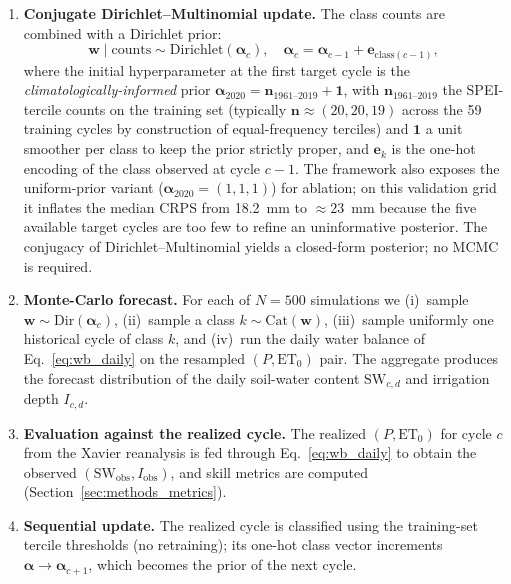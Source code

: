 \documentclass[review,5p,times]{elsarticle}
\begin{document}
\begin{enumerate}
\item \textbf{Conjugate Dirichlet--Multinomial update.} The class
counts are combined with a Dirichlet prior:
%
\begin{equation}
\boldsymbol{w} \mid \mathrm{counts} \sim \mathrm{Dirichlet}(\boldsymbol{\alpha}_c), \quad
\boldsymbol{\alpha}_c = \boldsymbol{\alpha}_{c-1} + \boldsymbol{e}_{\mathrm{class}(c-1)},
\label{eq:dirichlet}
\end{equation}
%
where the initial hyperparameter at the first target cycle is the
\emph{climatologically-informed} prior
$\boldsymbol{\alpha}_{2020} = \boldsymbol{n}_{1961\text{--}2019} +
\boldsymbol{1}$, with $\boldsymbol{n}_{1961\text{--}2019}$ the
SPEI-tercile counts on the training set (typically
$\boldsymbol{n}\approx(20,20,19)$ across the 59 training cycles by
construction of equal-frequency terciles) and $\boldsymbol{1}$ a
unit smoother per class to keep the prior strictly proper, and
$\boldsymbol{e}_k$ is the one-hot encoding of the class observed
at cycle $c-1$. The framework also exposes the uniform-prior
variant ($\boldsymbol{\alpha}_{2020}=(1,1,1)$) for ablation; on this
validation grid it inflates the median CRPS from 18.2~mm to
$\approx 23$~mm because the five available target cycles are too few
to refine an uninformative posterior. The conjugacy of
Dirichlet--Multinomial yields a closed-form posterior; no MCMC is
required.

\item \textbf{Monte-Carlo forecast.} For each of $N = 500$ simulations
we (i)~sample $\boldsymbol{w} \sim \mathrm{Dir}(\boldsymbol{\alpha}_c)$,
(ii)~sample a class $k \sim \mathrm{Cat}(\boldsymbol{w})$,
(iii)~sample uniformly one historical cycle of class $k$, and
(iv)~run the daily water balance of Eq.~\ref{eq:wb_daily} on the
resampled $(P, \mathrm{ET}_0)$ pair. The aggregate produces the
forecast distribution of the daily soil-water content
$\mathrm{SW}_{c,d}$ and irrigation depth $I_{c,d}$.

\item \textbf{Evaluation against the realized cycle.} The realized
$(P, \mathrm{ET}_0)$ for cycle $c$ from the Xavier reanalysis is fed
through Eq.~\ref{eq:wb_daily} to obtain the observed
$(\mathrm{SW}_{\mathrm{obs}}, I_{\mathrm{obs}})$, and skill metrics
are computed (Section~\ref{sec:methods_metrics}).

\item \textbf{Sequential update.} The realized cycle is classified
using the training-set tercile thresholds (no retraining); its
one-hot class vector increments
$\boldsymbol{\alpha} \to \boldsymbol{\alpha}_{c+1}$, which becomes the
prior of the next cycle.
\end{enumerate}
\end{document}
